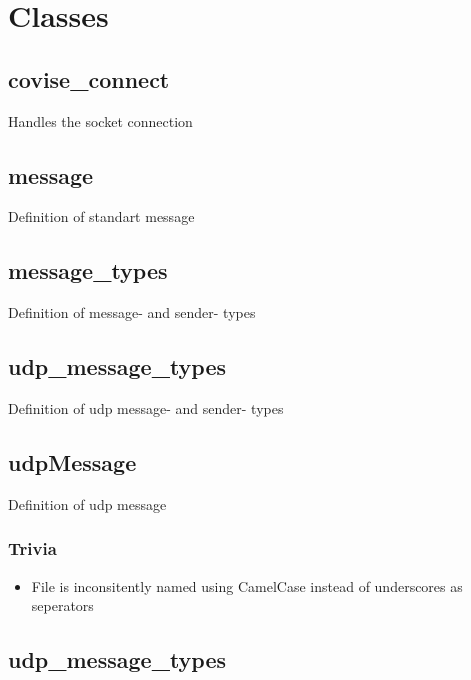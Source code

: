 \begin{messagetypes}
\end{messagetypes}

\section{Classes}

\subsection{covise\_connect}

Handles the socket connection 

\subsection{message}

Definition of standart message

\subsection{message\_types}

Definition of message- and sender- types 

\subsection{udp\_message\_types}
Definition of udp message- and sender- types 

\subsection{udpMessage}
Definition of udp message


\subsubsection{Trivia}

\begin{itemize}
	\item File is inconsitently named using CamelCase instead of underscores as seperators
\end{itemize}

\subsection{udp\_message\_types}
